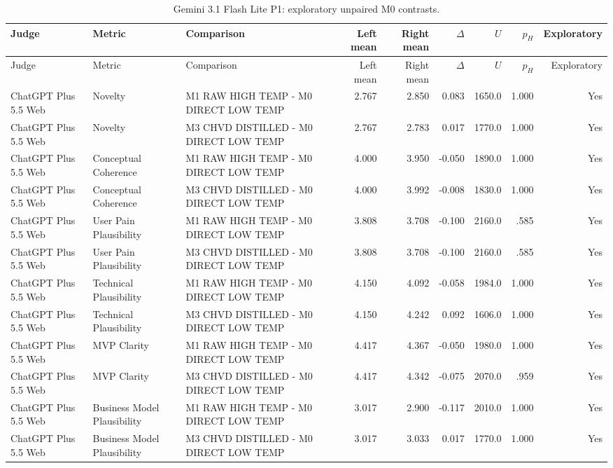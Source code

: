 \documentclass[10pt]{article}
\begin{document}
\begin{landscape}
\small
\begin{longtable}{lllrrrrrr}
\caption{Gemini 3.1 Flash Lite P1: exploratory unpaired M0 contrasts.}\label{tab:s15-m031}\\
\toprule Judge & Metric & Comparison & Left mean & Right mean & $\Delta$ & $U$ & $p_H$ & Exploratory \\ \midrule\endfirsthead
\toprule Judge & Metric & Comparison & Left mean & Right mean & $\Delta$ & $U$ & $p_H$ & Exploratory \\ \midrule\endhead
\bottomrule\endfoot
ChatGPT Plus 5.5 Web & Novelty & M1 RAW HIGH TEMP - M0 DIRECT LOW TEMP & 2.767 & 2.850 & 0.083 & 1650.0 & 1.000 & Yes \\
ChatGPT Plus 5.5 Web & Novelty & M3 CHVD DISTILLED - M0 DIRECT LOW TEMP & 2.767 & 2.783 & 0.017 & 1770.0 & 1.000 & Yes \\
ChatGPT Plus 5.5 Web & Conceptual Coherence & M1 RAW HIGH TEMP - M0 DIRECT LOW TEMP & 4.000 & 3.950 & -0.050 & 1890.0 & 1.000 & Yes \\
ChatGPT Plus 5.5 Web & Conceptual Coherence & M3 CHVD DISTILLED - M0 DIRECT LOW TEMP & 4.000 & 3.992 & -0.008 & 1830.0 & 1.000 & Yes \\
ChatGPT Plus 5.5 Web & User Pain Plausibility & M1 RAW HIGH TEMP - M0 DIRECT LOW TEMP & 3.808 & 3.708 & -0.100 & 2160.0 & .585 & Yes \\
ChatGPT Plus 5.5 Web & User Pain Plausibility & M3 CHVD DISTILLED - M0 DIRECT LOW TEMP & 3.808 & 3.708 & -0.100 & 2160.0 & .585 & Yes \\
ChatGPT Plus 5.5 Web & Technical Plausibility & M1 RAW HIGH TEMP - M0 DIRECT LOW TEMP & 4.150 & 4.092 & -0.058 & 1984.0 & 1.000 & Yes \\
ChatGPT Plus 5.5 Web & Technical Plausibility & M3 CHVD DISTILLED - M0 DIRECT LOW TEMP & 4.150 & 4.242 & 0.092 & 1606.0 & 1.000 & Yes \\
ChatGPT Plus 5.5 Web & MVP Clarity & M1 RAW HIGH TEMP - M0 DIRECT LOW TEMP & 4.417 & 4.367 & -0.050 & 1980.0 & 1.000 & Yes \\
ChatGPT Plus 5.5 Web & MVP Clarity & M3 CHVD DISTILLED - M0 DIRECT LOW TEMP & 4.417 & 4.342 & -0.075 & 2070.0 & .959 & Yes \\
ChatGPT Plus 5.5 Web & Business Model Plausibility & M1 RAW HIGH TEMP - M0 DIRECT LOW TEMP & 3.017 & 2.900 & -0.117 & 2010.0 & 1.000 & Yes \\
ChatGPT Plus 5.5 Web & Business Model Plausibility & M3 CHVD DISTILLED - M0 DIRECT LOW TEMP & 3.017 & 3.033 & 0.017 & 1770.0 & 1.000 & Yes \\

\end{longtable}
\end{landscape}
\end{document}
